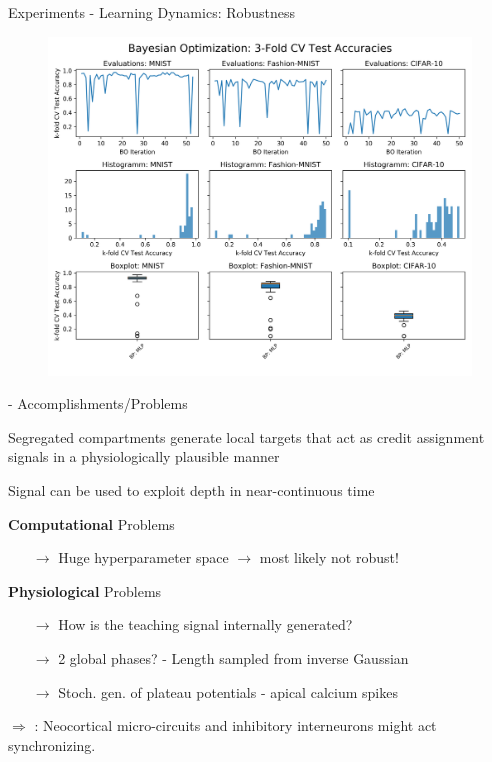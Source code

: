 \documentclass[dvipsnames, usenames]{beamer}
\newcommand{\cmark}{\ding{51}}%
\newcommand{\xmark}{\ding{55}}%
\newcommand{\done}{\rlap{$\square$}{\raisebox{2pt}{\large\hspace{1pt}\cmark}}%
\hspace{-2.5pt}}
\newcommand{\wontfix}{\rlap{$\square$}{\large\hspace{1pt}\xmark}}
\begin{document}

\begin{frame}{Experiments - Learning Dynamics: Robustness}
	\begin{figure}
		\centering
		\includegraphics[width=\textwidth]{../figures/bayes_opt_comparison}
	\end{figure}
\end{frame}

\begin{frame}{\citet{guerguiev2017} - Accomplishments/Problems}

\begin{todolist}
	\item[\done] Segregated compartments generate local targets that act as credit assignment signals in a physiologically plausible manner
	\item[\done] Signal can be used to exploit depth in near-continuous time
	\item[\wontfix] \textbf{Computational} Problems
	\begin{itemize}
		\item[$\rightarrow$] Huge hyperparameter space $\to$ most likely not robust!
	\end{itemize}
	\item[\wontfix] \textbf{Physiological} Problems
	\begin{itemize}
	\item[$\rightarrow$] How is the teaching signal internally generated?
	\item[$\rightarrow$] 2 global phases? - Length sampled from inverse Gaussian
	\item[$\rightarrow$] Stoch. gen. of plateau potentials - apical calcium spikes
	\end{itemize}
	\item[$\Rightarrow$] \citet{sacramento2018}: Neocortical micro-circuits and inhibitory interneurons might act synchronizing.
\end{todolist}
\end{frame}
\end{document}
